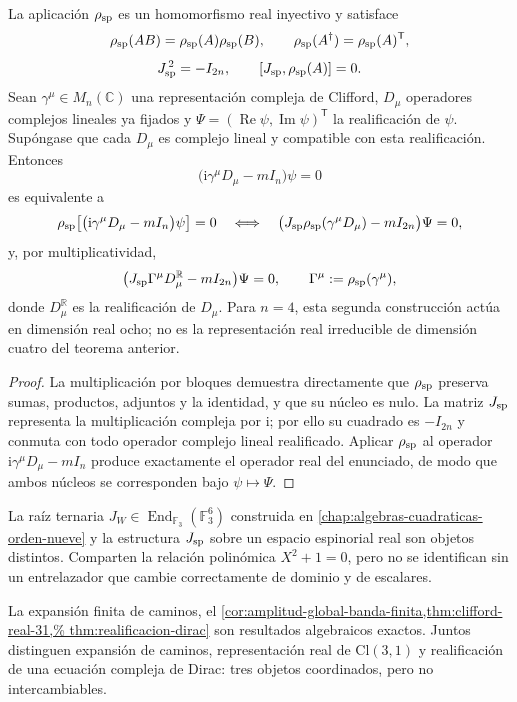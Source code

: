 \begin{theorem}
\label{thm:realificacion-dirac}
La aplicación \(\rho_{\rm sp}\) es un homomorfismo real inyectivo y satisface
\[
 \rho_{\rm sp}(AB)=\rho_{\rm sp}(A)\rho_{\rm sp}(B),
 \qquad
 \rho_{\rm sp}(A^\dagger)=\rho_{\rm sp}(A)^{\mathsf T},
 \]
\[
 J_{\rm sp}^{\,2}=-I_{2n},
 \qquad
 [J_{\rm sp},\rho_{\rm sp}(A)]=0.
\]
Sean \(\gamma^\mu\in M_n(\mathbb C)\) una representación compleja de
Clifford, \(D_\mu\) operadores complejos lineales ya fijados y
\(\Psi=(\operatorname{Re}\psi,\operatorname{Im}\psi)^{\mathsf T}\) la
realificación de \(\psi\). Supóngase que cada \(D_\mu\) es complejo lineal y
compatible con esta realificación. Entonces
\[
 \bigl(\mathrm i\gamma^\mu D_\mu-mI_n\bigr)\psi=0
\]
es equivalente a
\[
 \rho_{\rm sp}\!\left[
  \bigl(\mathrm i\gamma^\mu D_\mu-mI_n\bigr)\psi
 \right]=0
 \quad\Longleftrightarrow\quad
 \bigl(
 J_{\rm sp}\rho_{\rm sp}(\gamma^\mu D_\mu)
 -mI_{2n}
 \bigr)\Psi=0,
\]
y, por multiplicatividad,
\[
 \bigl(
 J_{\rm sp}\Gamma^\mu D_\mu^{\mathbb R}
 -mI_{2n}
 \bigr)\Psi=0,
 \qquad
 \Gamma^\mu:=\rho_{\rm sp}(\gamma^\mu),
\]
donde \(D_\mu^{\mathbb R}\) es la realificación de \(D_\mu\).
Para \(n=4\), esta segunda construcción actúa en dimensión real ocho; no es
la representación real irreducible de dimensión cuatro del teorema anterior.
\end{theorem}

\begin{proof}
La multiplicación por bloques demuestra directamente que
\(\rho_{\rm sp}\) preserva sumas, productos, adjuntos y la identidad, y que
su núcleo es nulo. La matriz \(J_{\rm sp}\) representa la multiplicación compleja por
\(\mathrm i\); por ello su cuadrado es \(-I_{2n}\) y conmuta con todo
operador complejo lineal realificado. Aplicar \(\rho_{\rm sp}\) al operador
\(\mathrm i\gamma^\mu D_\mu-mI_n\) produce exactamente el operador real del
enunciado, de modo que ambos núcleos se corresponden bajo
\(\psi\mapsto\Psi\).
\end{proof}

La raíz ternaria
\(J_W\in\operatorname{End}_{\mathbb F_3}(\mathbb F_3^6)\) construida en
\cref{chap:algebras-cuadraticas-orden-nueve} y la estructura
\(J_{\rm sp}\) sobre un espacio espinorial real son objetos distintos.
Comparten la relación polinómica \(X^2+1=0\), pero no se identifican sin un
entrelazador que cambie correctamente de dominio y de escalares.

La expansión finita de caminos, el
\cref{cor:amplitud-global-banda-finita,thm:clifford-real-31,%
thm:realificacion-dirac} son resultados algebraicos exactos. Juntos
distinguen expansión de caminos, representación real de
\(\mathrm{Cl}(3,1)\) y realificación de una ecuación compleja de Dirac: tres
objetos coordinados, pero no intercambiables.
\fi
